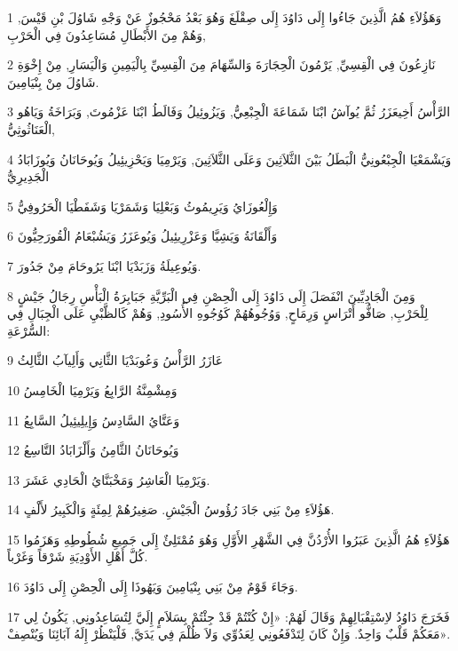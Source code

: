 \par 1 وَهَؤُلاَءِ هُمُ الَّذِينَ جَاءُوا إِلَى دَاوُدَ إِلَى صِقْلَغَ وَهُوَ بَعْدُ مَحْجُوزٌ عَنْ وَجْهِ شَاوُلَ بْنِ قَيْسَ, وَهُمْ مِنَ الأَبْطَالِ مُسَاعِدُونَ فِي الْحَرْبِ,
\par 2 نَازِعُونَ فِي الْقِسِيِّ, يَرْمُونَ الْحِجَارَةَ وَالسِّهَامَ مِنَ الْقِسِيِّ بِالْيَمِينِ وَالْيَسَارِ, مِنْ إِخْوَةِ شَاوُلَ مِنْ بِنْيَامِينَ.
\par 3 الرَّأْسُ أَخِيعَزَرُ ثُمَّ يُوآشُ ابْنَا شَمَاعَةَ الْجِبْعِيُّ, وَيَزُوئِيلُ وَفَالَطُ ابْنَا عَزْمُوتَ, وَبَرَاخَةُ وَيَاهُو الْعَنَاثُوثِيُّ,
\par 4 وَيَشْمَعْيَا الْجِبْعُونِيُّ الْبَطَلُ بَيْنَ الثَّلاَثِينَ وَعَلَى الثَّلاَثِينَ, وَيَرْمِيَا وَيَحْزِيئِيلُ وَيُوحَانَانُ وَيُوزَابَادُ الْجَدِيرِيُّ
\par 5 وَإِلْعُوزَايُ وَيَرِيمُوثُ وَبَعْلِيَا وَشَمَرْيَا وَشَفَطْيَا الْحَرُوفِيُّ
\par 6 وَأَلْقَانَةُ وَيَشِيَّا وَعَزْرِيئِيلُ وَيُوعَزَرُ وَيَشُبْعَامُ الْقُورَحِيُّونَ
\par 7 وَيُوعِيلَةُ وَزَبَدْيَا ابْنَا يَرُوحَامَ مِنْ جَدُورَ.
\par 8 وَمِنَ الْجَادِيِّينَ انْفَصَلَ إِلَى دَاوُدَ إِلَى الْحِصْنِ فِي الْبَرِّيَّةِ جَبَابِرَةُ الْبَأْسِ رِجَالُ جَيْشٍ لِلْحَرْبِ, صَافُّو أَتْرَاسٍ وَرِمَاحٍ, وَوُجُوهُهُمْ كَوُجُوهِ الأُسُودِ, وَهُمْ كَالظَّبْيِ عَلَى الْجِبَالِ فِي السُّرْعَةِ:
\par 9 عَازَرُ الرَّأْسُ وَعُوبَدْيَا الثَّانِي وَأَلِيآبُ الثَّالِثُ
\par 10 وَمِشْمِنَّةُ الرَّابِعُ وَيَرْمِيَا الْخَامِسُ
\par 11 وَعَتَّايُ السَّادِسُ وَإِيلِيئِيلُ السَّابِعُ
\par 12 وَيُوحَانَانُ الثَّامِنُ وَأَلْزَابَادُ التَّاسِعُ
\par 13 وَيَرْمِيَا الْعَاشِرُ وَمَخْبَنَّايُ الْحَادِي عَشَرَ.
\par 14 هَؤُلاَءِ مِنْ بَنِي جَادَ رُؤُوسُ الْجَيْشِ. صَغِيرُهُمْ لِمِئَةٍ وَالْكَبِيرُ لأَلْفٍ.
\par 15 هَؤُلاَءِ هُمُ الَّذِينَ عَبَرُوا الأُرْدُنَّ فِي الشَّهْرِ الأَوَّلِ وَهُوَ مُمْتَلِئٌ إِلَى جَمِيعِ شُطُوطِهِ وَهَزَمُوا كُلَّ أَهْلِ الأَوْدِيَةِ شَرْقاً وَغَرْباً.
\par 16 وَجَاءَ قَوْمٌ مِنْ بَنِي بِنْيَامِينَ وَيَهُوذَا إِلَى الْحِصْنِ إِلَى دَاوُدَ.
\par 17 فَخَرَجَ دَاوُدُ لاِسْتِقْبَالِهِمْ وَقَالَ لَهُمْ: «إِنْ كُنْتُمْ قَدْ جِئْتُمْ بِسَلاَمٍ إِلَيَّ لِتُسَاعِدُونِي, يَكُونُ لِي مَعَكُمْ قَلْبٌ وَاحِدٌ. وَإِنْ كَانَ لِتَدْفَعُونِي لِعَدُوِّي وَلاَ ظُلْمَ فِي يَدَيَّ, فَلْيَنْظُرْ إِلَهُ آبَائِنَا وَيُنْصِفْ».
